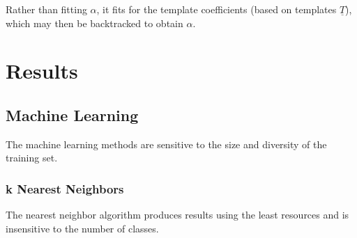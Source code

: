 \documentclass[12pt, preprint]{aastex}
\newcommand{\textul}{\underline}
\begin{document}
Rather than fitting $\alpha$, it fits for the template coefficients (based on templates $\textul{T}$), which may then be backtracked to obtain $\alpha$.

\section{Results}

\subsection{Machine Learning}

The machine learning methods are sensitive to the size and diversity of the training set.

\subsubsection{k Nearest Neighbors}

The nearest neighbor algorithm produces results using the least resources and is insensitive to the number of classes.
\end{document}
